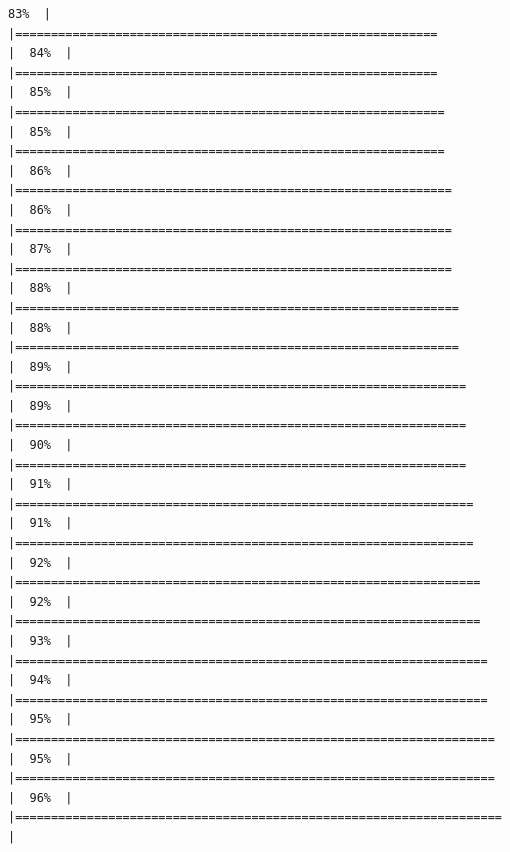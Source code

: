 \documentclass[
  english,
  man,a4paper,mask,floatsintext]{apa6}
\begin{document}
\begin{verbatim}
83%  |                                                                              |===========================================================           |  84%  |                                                                              |===========================================================           |  85%  |                                                                              |============================================================          |  85%  |                                                                              |============================================================          |  86%  |                                                                              |=============================================================         |  86%  |                                                                              |=============================================================         |  87%  |                                                                              |=============================================================         |  88%  |                                                                              |==============================================================        |  88%  |                                                                              |==============================================================        |  89%  |                                                                              |===============================================================       |  89%  |                                                                              |===============================================================       |  90%  |                                                                              |===============================================================       |  91%  |                                                                              |================================================================      |  91%  |                                                                              |================================================================      |  92%  |                                                                              |=================================================================     |  92%  |                                                                              |=================================================================     |  93%  |                                                                              |==================================================================    |  94%  |                                                                              |==================================================================    |  95%  |                                                                              |===================================================================   |  95%  |                                                                              |===================================================================   |  96%  |                                                                              |====================================================================  |  
\end{verbatim}
\end{document}
